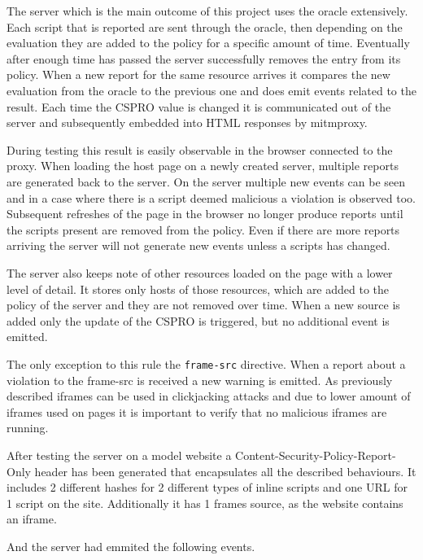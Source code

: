 The server which is the main outcome of this project uses the oracle extensively.
Each script that is reported are sent through the oracle, then depending on the evaluation they are added to the policy for a specific amount of time.
Eventually after enough time has passed the server successfully removes the entry from its policy.
When a new report for the same resource arrives it compares the new evaluation from the oracle to the previous one and does emit events related to the result.
Each time the CSPRO value is changed it is communicated out of the server and subsequently embedded into HTML responses by mitmproxy.

During testing this result is easily observable in the browser connected to the proxy.
When loading the host page on a newly created server, multiple reports are generated back to the server.
On the server multiple new events can be seen and in a case where there is a script deemed malicious a violation is observed too.
Subsequent refreshes of the page in the browser no longer produce reports until the scripts present are removed from the policy.
Even if there are more reports arriving the server will not generate new events unless a scripts has changed.

The server also keeps note of other resources loaded on the page with a lower level of detail.
It stores only hosts of those resources, which are added to the policy of the server and they are not removed over time.
When a new source is added only the update of the CSPRO is triggered, but no additional event is emitted.

The only exception to this rule the \texttt{frame-src} directive. 
When a report about a violation to the frame-src is received a new warning is emitted.
As previously described iframes can be used in clickjacking attacks and due to lower amount of iframes used on pages it is important to verify that no malicious iframes are running.

After testing the server on a model website a Content-Security-Policy-Report-Only header has been generated that encapsulates all the described behaviours.
It includes 2 different hashes for 2 different types of inline scripts and one URL for 1 script on the site.
Additionally it has 1 frames source, as the website contains an iframe.



And the server had emmited the following events.



